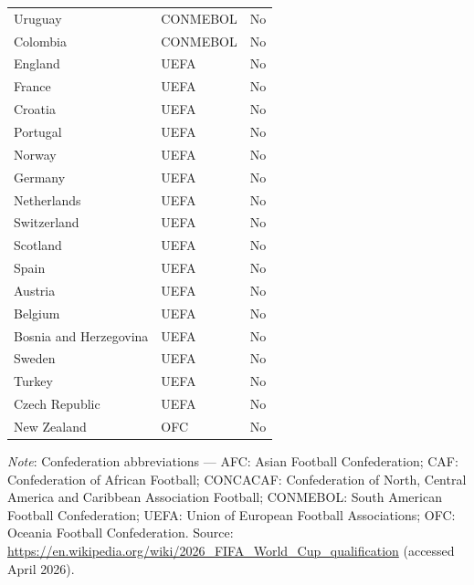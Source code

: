 \documentclass[12pt]{article}
\begin{document}
\begin{longtable}{llc}
Uruguay        & CONMEBOL & No \\
Colombia       & CONMEBOL & No \\
England        & UEFA & No \\
France         & UEFA & No \\
Croatia        & UEFA & No \\
Portugal       & UEFA & No \\
Norway         & UEFA & No \\
Germany        & UEFA & No \\
Netherlands    & UEFA & No \\
Switzerland    & UEFA & No \\
Scotland       & UEFA & No \\
Spain          & UEFA & No \\
Austria        & UEFA & No \\
Belgium        & UEFA & No \\
Bosnia and Herzegovina & UEFA & No \\
Sweden         & UEFA & No \\
Turkey         & UEFA & No \\
Czech Republic & UEFA & No \\
New Zealand    & OFC & No \\
\end{longtable}

\noindent\small
\textit{Note}: Confederation abbreviations --- AFC: Asian Football
Confederation; CAF: Confederation of African Football; CONCACAF:
Confederation of North, Central America and Caribbean Association
Football; CONMEBOL: South American Football Confederation; UEFA:
Union of European Football Associations; OFC: Oceania Football
Confederation. Source: \url{https://en.wikipedia.org/wiki/2026_FIFA_World_Cup_qualification}
(accessed April 2026).
\end{document}
